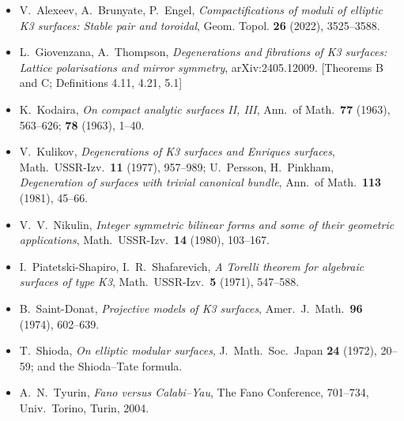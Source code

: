 \documentclass[11pt]{article}
\begin{document}
\begin{itemize}[leftmargin=2em]
\item[{[ABE]}] V.~Alexeev, A.~Brunyate, P.~Engel,
\emph{Compactifications of moduli of elliptic K3 surfaces: Stable pair and
toroidal}, Geom. Topol. \textbf{26} (2022), 3525--3588.
\item[{[GT]}] L.~Giovenzana, A.~Thompson,
\emph{Degenerations and fibrations of K3 surfaces: Lattice polarisations and
mirror symmetry}, arXiv:2405.12009. [Theorems B and C; Definitions 4.11,
4.21, 5.1]
\item[{[Kod]}] K.~Kodaira, \emph{On compact analytic surfaces II, III},
Ann.\ of Math.\ \textbf{77} (1963), 563--626; \textbf{78} (1963), 1--40.
\item[{[KPP]}] V.~Kulikov, \emph{Degenerations of K3 surfaces and Enriques
surfaces}, Math.\ USSR-Izv.\ \textbf{11} (1977), 957--989;
U.~Persson, H.~Pinkham, \emph{Degeneration of surfaces with trivial
canonical bundle}, Ann.\ of Math.\ \textbf{113} (1981), 45--66.
\item[{[Ni]}] V.~V.~Nikulin, \emph{Integer symmetric bilinear forms and
some of their geometric applications}, Math.\ USSR-Izv.\ \textbf{14}
(1980), 103--167.
\item[{[PS--Sh]}] I.~Piatetski-Shapiro, I.~R.~Shafarevich, \emph{A Torelli
theorem for algebraic surfaces of type K3}, Math.\ USSR-Izv.\ \textbf{5}
(1971), 547--588.
\item[{[SD]}] B.~Saint-Donat, \emph{Projective models of K3 surfaces},
Amer.\ J.~Math.\ \textbf{96} (1974), 602--639.
\item[{[Sh]}] T.~Shioda, \emph{On elliptic modular surfaces},
J.~Math.\ Soc.\ Japan \textbf{24} (1972), 20--59; and the Shioda--Tate
formula.
\item[{[Ty]}] A.~N.~Tyurin, \emph{Fano versus Calabi--Yau}, The Fano
Conference, 701--734, Univ.\ Torino, Turin, 2004.
\end{itemize}
\end{document}
